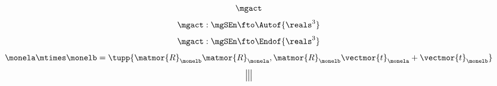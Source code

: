 {\begin{forslides}
\begin{equation}
            \label{eq:only-apply}
            \mgact
        \end{equation}
        \begin{equation}
            \label{eq:apply-morphism}
            \mgact: \mgSEn \fto \Autof {\reals^3}
        \end{equation}
        \begin{equation}
            \label{eq:apply-end}
            \mgact: \mgSEn \fto \Endof {\reals^3}
        \end{equation}
        \begin{equation}
            \label{eq:rototranslation-clean}
            \monela \mtimes \monelb = \tupp{\matmor{R}_{\monelb} \matmor{R}_{\monela}, \matmor{R}_{\monelb} \vectmor{t}_{\monela} + \vectmor{t}_{\monelb}}
        \end{equation}
        \begin{equation}\label{eq:slides-actions-000}
            ...
        \end{equation}
        \begin{equation}\label{eq:slides-actions-001}
            ...
        \end{equation}
        \begin{equation}\label{eq:slides-actions-002}
            ...
        \end{equation}
        \begin{equation}\label{eq:slides-actions-003}
            ...
        \end{equation}
        \begin{equation}\label{eq:slides-actions-004}
            ...
        \end{equation}
        \begin{equation}\label{eq:slides-actions-005}
            ...
        \end{equation}
        \begin{equation}\label{eq:slides-actions-006}
            ...
        \end{equation}
        \begin{equation}\label{eq:slides-actions-007}
            ...
        \end{equation}
        \begin{equation}\label{eq:slides-actions-008}
            ...
        \end{equation}
        \begin{equation}\label{eq:slides-actions-009}
            ...
        \end{equation}


\end{forslides}}
